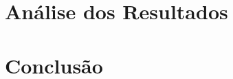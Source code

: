 \documentclass[12pt,a4paper,header]{abnt}
\begin{document}
\chapter{Análise dos Resultados}


% 
% 
% 
% 
% 
% 
% 

\chapter{Conclusão}
\end{document}
